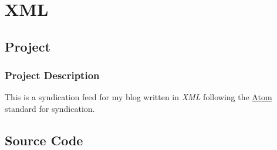 \section{XML}\label{sec:xml}

\subsection{Project}

\subsubsection*{Project Description}

This is a syndication feed for my blog written in \textit{XML} following the \href{http://www.w3.org/2005/Atom}{Atom} standard for syndication.


\subsection{Source Code}

\inputminted[linenos, breaklines, encoding=utf8, frame=lines]{xml}{"./code/feed.xml"}


\pagebreak
